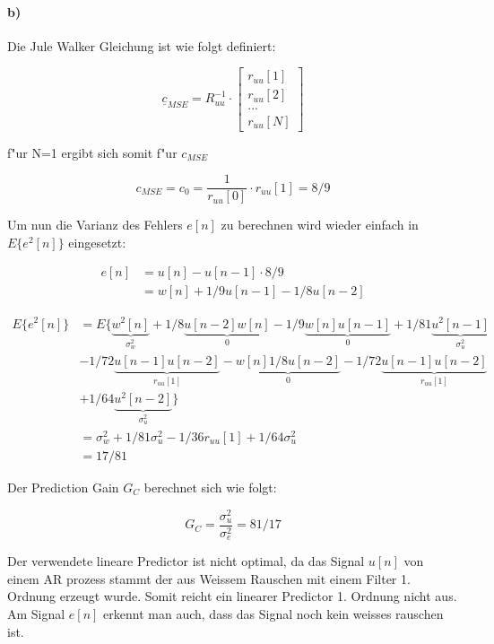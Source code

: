 \paragraph{b)}

Die Jule Walker Gleichung ist wie folgt definiert:

\begin{equation}
 \underline{c}_{MSE} = R_{uu}^{-1} \cdot \begin{bmatrix} r_{uu}[1] \\ r_{uu}[2] \\ ... \\ r_{uu}[N]\end{bmatrix}
\end{equation}

f"ur N=1 ergibt sich somit f"ur $c_{MSE}$

\begin{equation}
 c_{MSE} = c_0 = \frac{1}{r_{uu}[0]} \cdot r_{uu}[1] = 8/9
\end{equation}


Um nun die Varianz des Fehlers $e[n]$ zu berechnen  wird wieder einfach in $E\{e^2[n]\}$ eingesetzt:

\begin{align}
 e[n] &= u[n] - u[n-1] \cdot 8/9 \\
 &= w[n] + 1/9 u[n-1] - 1/8 u[n-2]
\end{align}

\begin{align}
 E\{e^2[n]\} &= E\{\underbrace{w^2[n]}_{\sigma_w^2} + 1/8 \underbrace{u[n-2]w[n]}_{0} - 1/9\underbrace{w[n]u[n-1]}_{0} + 1/81\underbrace{u^2[n-1]}_{\sigma_u^2} \\
 &- 1/72\underbrace{u[n-1]u[n-2]}_{r_{uu}[1]} - \underbrace{w[n]1/8u[n-2]}_{0} - 1/72\underbrace{u[n-1]u[n-2]}_{r_{uu}[1]}  \\
&+ 1/64\underbrace{u^2[n-2]}_{\sigma_u^2}\} \\
&= \sigma_w^2 + 1/81\sigma_u^2 - 1/36r_{uu}[1] + 1/64\sigma_u^2 \\
&= 17/81
\end{align}

Der Prediction Gain $G_C$ berechnet sich wie folgt:

\begin{equation}
 G_C = \frac{\sigma_u^2}{\sigma_e^2} = 81/17
\end{equation}


Der verwendete lineare Predictor ist nicht optimal, da das Signal $u[n]$ von einem AR prozess
stammt der aus Weissem Rauschen mit einem Filter 1. Ordnung erzeugt wurde. Somit reicht ein
linearer Predictor 1. Ordnung nicht aus. 
Am Signal $e[n]$ erkennt man auch, dass das Signal noch kein weisses rauschen ist.


